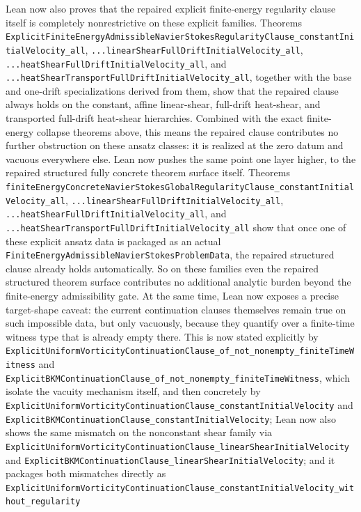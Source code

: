 \documentclass[11pt]{article}
\begin{document}
Lean now also proves that the repaired explicit finite-energy regularity clause
itself is completely nonrestrictive on these explicit families.  Theorems
\texttt{ExplicitFiniteEnergyAdmissibleNavierStokesRegularityClause\_constantInitialVelocity\_all},
\texttt{...linearShearFullDriftInitialVelocity\_all},
\texttt{...heatShearFullDriftInitialVelocity\_all}, and
\texttt{...heatShearTransportFullDriftInitialVelocity\_all}, together with the
base and one-drift specializations derived from them, show that the repaired
clause always holds on the constant, affine linear-shear, full-drift
heat-shear, and transported full-drift heat-shear hierarchies.  Combined with
the exact finite-energy collapse theorems above, this means the repaired clause
contributes no further obstruction on these ansatz classes: it is realized at
the zero datum and vacuous everywhere else.
Lean now pushes the same point one layer higher, to the repaired structured
fully concrete theorem surface itself.  Theorems
\texttt{finiteEnergyConcreteNavierStokesGlobalRegularityClause\_constantInitialVelocity\_all},
\texttt{...linearShearFullDriftInitialVelocity\_all},
\texttt{...heatShearFullDriftInitialVelocity\_all}, and
\texttt{...heatShearTransportFullDriftInitialVelocity\_all} show that once one
of these explicit ansatz data is packaged as an actual
\texttt{FiniteEnergyAdmissibleNavierStokesProblemData}, the repaired structured
clause already holds automatically.  So on these families even the repaired
structured theorem surface contributes no additional analytic burden beyond the
finite-energy admissibility gate.
At the same time, Lean now exposes a precise target-shape caveat: the current
continuation clauses themselves remain true on such impossible data, but only
vacuously, because they quantify over a finite-time witness type that is
already empty there.  This is now stated explicitly by
\texttt{ExplicitUniformVorticityContinuationClause\_of\_not\_nonempty\_finiteTimeWitness}
and \texttt{ExplicitBKMContinuationClause\_of\_not\_nonempty\_finiteTimeWitness},
which isolate the vacuity mechanism itself, and then concretely by
\texttt{ExplicitUniformVorticityContinuationClause\_constantInitialVelocity} and
\texttt{ExplicitBKMContinuationClause\_constantInitialVelocity}; Lean now also
shows the same mismatch on the nonconstant shear family via
\texttt{ExplicitUniformVorticityContinuationClause\_linearShearInitialVelocity}
and \texttt{ExplicitBKMContinuationClause\_linearShearInitialVelocity}; and it
packages both mismatches directly as
\texttt{ExplicitUniformVorticityContinuationClause\_constantInitialVelocity\_without\_regularity}
\end{document}

